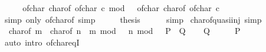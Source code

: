 \begin{isabellebody}
%
\isadelimproof
%
\endisadelimproof
%
\isatagproof
{}\isamarkupfalse%
\ {\isacharminus}{\kern0pt}\isanewline
\ \ \isamarkupfalse%
\ {\isacartoucheopen}of{\isacharunderscore}{\kern0pt}char\ {\isacharparenleft}{\kern0pt}char{\isacharunderscore}{\kern0pt}of\ {\isacharparenleft}{\kern0pt}of{\isacharunderscore}{\kern0pt}char\ c{\isacharparenright}{\kern0pt}{\isacharparenright}{\kern0pt}\ mod\ {}{}{}\ {\isacharequal}{\kern0pt}\ of{\isacharunderscore}{\kern0pt}char\ {\isacharparenleft}{\kern0pt}char{\isacharunderscore}{\kern0pt}of\ {\isacharparenleft}{\kern0pt}of{\isacharunderscore}{\kern0pt}char\ c{\isacharparenright}{\kern0pt}{\isacharparenright}{\kern0pt}{\isacartoucheclose}\isanewline
\ \ \ \ \isamarkupfalse%
\ {\isacharparenleft}{\kern0pt}simp\ only{\isacharcolon}{\kern0pt}\ of{\isacharunderscore}{\kern0pt}char{\isacharunderscore}{\kern0pt}of{\isacharparenright}{\kern0pt}\ simp\isanewline
\ \ \isamarkupfalse%
\ \isamarkupfalse%
\ {\isacharquery}{\kern0pt}thesis\isanewline
\ \ \ \ \isamarkupfalse%
\ simp\isanewline
{}\isamarkupfalse%
%
\endisatagproof
{\isafoldproof}%
%
\isadelimproof
\isanewline
%
\endisadelimproof
\isanewline
{}\isamarkupfalse%
\ char{\isacharunderscore}{\kern0pt}of{\isacharunderscore}{\kern0pt}quasi{\isacharunderscore}{\kern0pt}inj\ {\isacharbrackleft}{\kern0pt}simp{\isacharbrackright}{\kern0pt}{\isacharcolon}{\kern0pt}\isanewline
\ \ {\isacartoucheopen}char{\isacharunderscore}{\kern0pt}of\ m\ {\isacharequal}{\kern0pt}\ char{\isacharunderscore}{\kern0pt}of\ n\ {\isasymlongleftrightarrow}\ m\ mod\ {}{}{}\ {\isacharequal}{\kern0pt}\ n\ mod\ {}{}{}{\isacartoucheclose}\ {\isacharparenleft}{\kern0pt}\ {\isacartoucheopen}{\isacharquery}{\kern0pt}P\ {\isasymlongleftrightarrow}\ {\isacharquery}{\kern0pt}Q{\isacartoucheclose}{\isacharparenright}{\kern0pt}\isanewline
%
\isadelimproof
%
\endisadelimproof
%
\isatagproof
{}\isamarkupfalse%
\isanewline
\ \ \isamarkupfalse%
\ {\isacharquery}{\kern0pt}Q\isanewline
\ \ \isamarkupfalse%
\ \isamarkupfalse%
\ {\isacharquery}{\kern0pt}P\isanewline
\ \ \ \ \isamarkupfalse%
\ {\isacharparenleft}{\kern0pt}auto\ intro{\isacharcolon}{\kern0pt}\ of{\isacharunderscore}{\kern0pt}char{\isacharunderscore}{\kern0pt}eqI{\isacharparenright}{\kern0pt}\isanewline
{}\isamarkupfalse%

\end{isabellebody}
